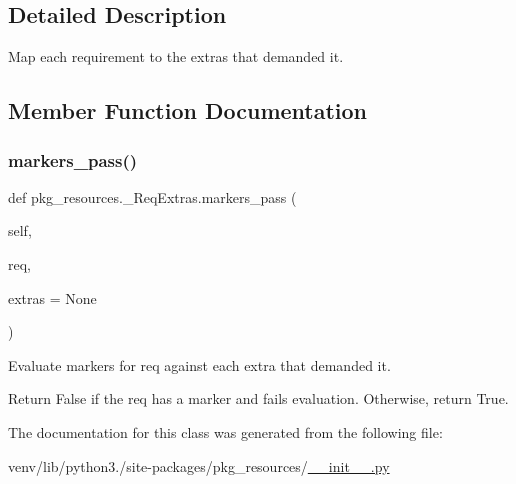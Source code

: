 \subsection{Detailed Description}
\begin{DoxyVerb}Map each requirement to the extras that demanded it.
\end{DoxyVerb}
 

\subsection{Member Function Documentation}
\mbox{\label{classpkg__resources_1_1__ReqExtras_a435242531f1af2132de48679c5edf3c7}} 
\subsubsection{\texorpdfstring{markers\+\_\+pass()}{markers\_pass()}}
{\footnotesize\ttfamily def pkg\+\_\+resources.\+\_\+\+Req\+Extras.\+markers\+\_\+pass (\begin{DoxyParamCaption}\item[{}]{self,  }\item[{}]{req,  }\item[{}]{extras = {\ttfamily None} }\end{DoxyParamCaption})}

\begin{DoxyVerb}Evaluate markers for req against each extra that
demanded it.

Return False if the req has a marker and fails
evaluation. Otherwise, return True.
\end{DoxyVerb}
 

The documentation for this class was generated from the following file\+:\begin{DoxyCompactItemize}
\item 
venv/lib/python3./site-\/packages/pkg\+\_\+resources/\hyperlink{venv_2lib_2python3_89_2site-packages_2pkg__resources_2____init_____8py}{\+\_\+\+\_\+init\+\_\+\+\_\+.\+py}\end{DoxyCompactItemize}
